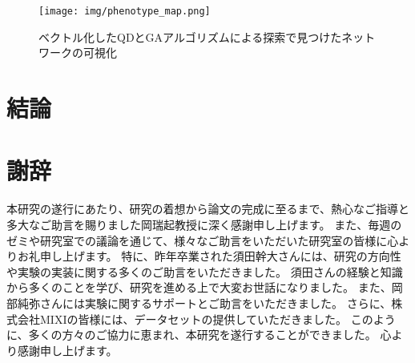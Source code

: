 \documentclass[uplatex,11pt,openany]{ujreport}
\renewcommand{\bibname}{参考文献}
\begin{document}
            \begin{figure}[htbp]
                \centering
                \texttt{[image: img/phenotype\_map.png]}
                \caption{ベクトル化したQDとGAアルゴリズムによる探索で見つけたネットワークの可視化}
                \label{fig:phenotype_map}
            \end{figure}






\chapter{結論}


\chapter*{謝辞}
    本研究の遂行にあたり、研究の着想から論文の完成に至るまで、熱心なご指導と多大なご助言を賜りました岡瑞起教授に深く感謝申し上げます。
    また、毎週のゼミや研究室での議論を通じて、様々なご助言をいただいた研究室の皆様に心よりお礼申し上げます。
    特に、昨年卒業された須田幹大さんには、研究の方向性や実験の実装に関する多くのご助言をいただきました。
    須田さんの経験と知識から多くのことを学び、研究を進める上で大変お世話になりました。
    また、岡部純弥さんには実験に関するサポートとご助言をいただきました。
    さらに、株式会社MIXIの皆様には、データセットの提供していただきました。
    このように、多くの方々のご協力に恵まれ、本研究を遂行することができました。
    心より感謝申し上げます。


\newpage


% 
% 





\end{document}
